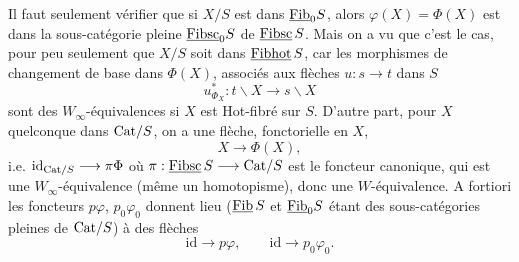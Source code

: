Il faut seulement vérifier que si $X/S$ est dans $\underline{\mathrm{Fib}}_0S$, alors $\varphi(X) = \Phi(X)$ est dans la sous-catégorie pleine $\underline{\mathrm{Fibsc}}_0S$ de $\underline{\mathrm{Fibsc}}\,S$. Mais on a vu que c'est le cas, pour peu seulement que $X/S$ soit dans $\underline{\mathrm{Fibhot}}\,S$, car les morphismes de changement de base dans $\Phi(X)$, associés aux flèches $u : s \longrightarrow t$ dans $S$
\[
u^*_{\Phi_X} : t\backslash X \longrightarrow s\backslash X
\]
sont des $W_\infty$-équivalences si $X$ est Hot-fibré sur $S$. D'autre part, pour $X$ quelconque dans $\mathrm{Cat}/S$, on a une flèche, fonctorielle en $X$,
\[
X \longrightarrow \Phi(X),
\]
i.e. $\mathrm{id}_{\mathrm{Cat}/S} \longrightarrow \pi\Phi$ où $\pi : \underline{\mathrm{Fibsc}}\,S \longrightarrow \mathrm{Cat}/S$ est le foncteur canonique, qui est une $W_\infty$-équivalence (même un homotopisme), donc une $W$-équivalence. A fortiori les foncteurs $p\varphi$, $p_0\varphi_0$ donnent lieu ($\underline{\mathrm{Fib}}\,S$ et $\underline{\mathrm{Fib}}_0S$ étant des sous-catégories pleines de $\mathrm{Cat}/S$) à des flèches
\[
\mathrm{id} \longrightarrow p\varphi, \qquad \mathrm{id} \longrightarrow p_0\varphi_0.
\]


